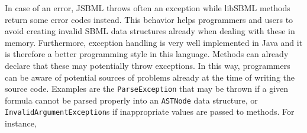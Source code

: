 In case of an error, JSBML
%
throws often an exception while libSBML methods
return some error codes instead. This behavior helps programmers and users to
avoid creating invalid SBML data structures already when dealing with these in
memory. Furthermore, exception handling is very well implemented in Java and it
is therefore a better programming style in this language. Methods can already
declare that these may potentially throw exceptions. In this way, programmers
can be aware of potential sources of problems already at the time of writing the
source code. Examples are the \texttt{ParseException}
%
that may be thrown if a given formula cannot be parsed properly into an
\texttt{ASTNode}
%
data structure, or \texttt{InvalidArgumentException}s
%
if inappropriate values are passed to methods. For instance,

